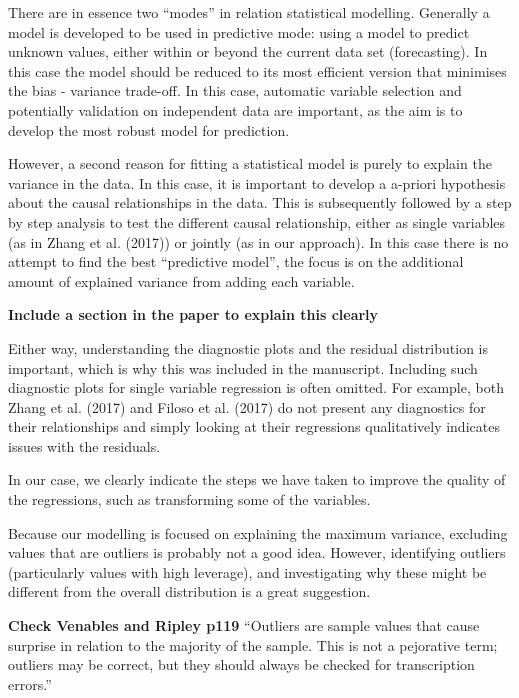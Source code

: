 \documentclass[]{elsarticle} %
\begin{document}
There are in essence two ``modes'' in relation statistical modelling. Generally a model is developed to be used in predictive mode: using a model to predict unknown values, either within or beyond the current data set (forecasting). In this case the model should be reduced to its most efficient version that minimises the bias - variance trade-off. In this case, automatic variable selection and potentially validation on independent data are important, as the aim is to develop the most robust model for prediction.

However, a second reason for fitting a statistical model is purely to explain the variance in the data. In this case, it is important to develop a a-priori hypothesis about the causal relationships in the data. This is subsequently followed by a step by step analysis to test the different causal relationship, either as single variables (as in Zhang et al. (2017)) or jointly (as in our approach). In this case there is no attempt to find the best ``predictive model'', the focus is on the additional amount of explained variance from adding each variable.

\textbf{Include a section in the paper to explain this clearly}

Either way, understanding the diagnostic plots and the residual distribution is important, which is why this was included in the manuscript. Including such diagnostic plots for single variable regression is often omitted. For example, both Zhang et al. (2017) and Filoso et al. (2017) do not present any diagnostics for their relationships and simply looking at their regressions qualitatively indicates issues with the residuals.

In our case, we clearly indicate the steps we have taken to improve the quality of the regressions, such as transforming some of the variables.

Because our modelling is focused on explaining the maximum variance, excluding values that are outliers is probably not a good idea. However, identifying outliers (particularly values with high leverage), and investigating why these might be different from the overall distribution is a great suggestion.

\textbf{Check Venables and Ripley p119}
``Outliers are sample values that cause surprise in relation to the majority of the sample. This is not a pejorative term; outliers may be correct, but they should always be checked for transcription errors.''
\end{document}
